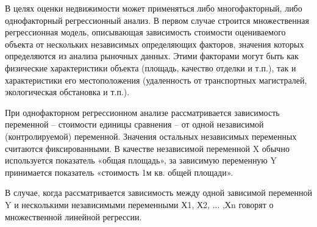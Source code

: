 В целях оценки недвижимости может применяться либо многофакторный, либо однофакторный регрессионный анализ.
В первом случае строится множественная регрессионная модель, описывающая зависимость стоимости оцениваемого объекта от
нескольких независимых определяющих факторов, значения которых определяются из анализа рыночных данных.
Этими факторами могут быть как физические характеристики объекта (площадь, качество отделки и т.п.), так и
характеристики его местоположения (удаленность от транспортных магистралей, экологическая обстановка и т.п.).

При однофакторном регрессионном анализе рассматривается зависимость переменной – стоимости единицы сравнения – от одной
независимой (контролируемой) переменной. Значения остальных независимых переменных считаются фиксированными.
В качестве независимой переменной X обычно используется показатель «общая площадь», за зависимую переменную Y
принимается показатель «стоимость 1м кв. общей площади».

В случае, когда рассматривается зависимость между одной зависимой переменной Y и несколькими независимыми
переменными Х1, Х2, ... ,Хn говорят о множественной линейной регрессии. 
